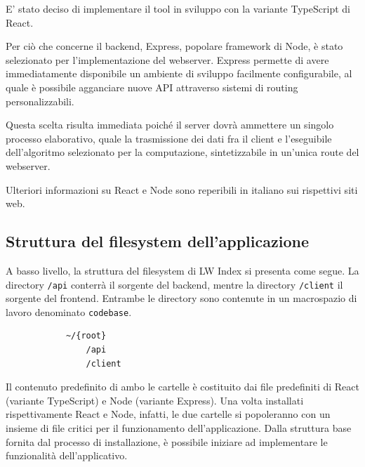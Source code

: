         E' stato deciso di implementare il tool in sviluppo con la variante TypeScript di React.
        
        \vspace{3mm}
        
        Per ciò che concerne il backend, Express, popolare framework di Node, è stato selezionato per l'implementazione del webserver. Express permette di avere immediatamente disponibile un ambiente di sviluppo facilmente configurabile, al quale è possibile agganciare nuove API attraverso sistemi di routing personalizzabili. 
        
        Questa scelta risulta immediata poiché il server dovrà ammettere un singolo processo elaborativo, quale la trasmissione dei dati fra il client e l'eseguibile dell'algoritmo selezionato per la computazione, sintetizzabile in un'unica route del webserver. 
        
        \vspace{3mm}
        
        Ulteriori informazioni su React \cite{react} e Node \cite{node} sono reperibili in italiano sui rispettivi siti web.
    
    \subsection{Struttura del filesystem dell'applicazione}
    
        A basso livello, la struttura del filesystem di LW Index si presenta come segue. La directory \verb|/api| conterrà il sorgente del backend, mentre la directory \verb|/client| il sorgente del frontend. Entrambe le directory sono contenute in un macrospazio di lavoro denominato \verb|codebase|.
    
        \begin{verbatim} 
            ~/{root}         
                /api
                /client
        \end{verbatim}
        
        Il contenuto predefinito di ambo le cartelle è costituito dai file predefiniti di React (variante TypeScript) e Node (variante Express). Una volta installati rispettivamente React e Node, infatti, le due cartelle si popoleranno con un insieme di file critici per il funzionamento dell'applicazione. Dalla struttura base fornita dal processo di installazione, è possibile iniziare ad implementare le funzionalità dell'applicativo.
        
        \vspace{3mm}
        
